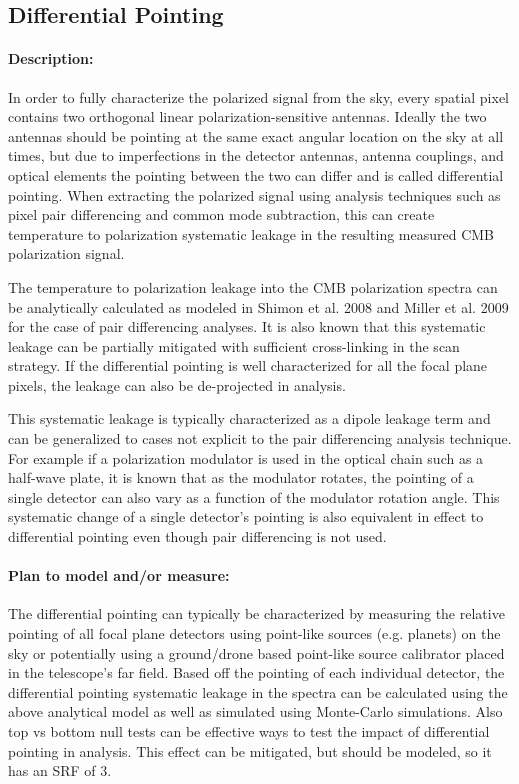 \subsection{Differential Pointing}

\paragraph{Description:}
In order to fully characterize the polarized signal from the sky, every spatial pixel contains two orthogonal linear polarization-sensitive antennas. Ideally the two antennas should be pointing at the same exact angular location on the sky at all times, but due to imperfections in the detector antennas, antenna couplings, and optical elements the pointing between the two can differ and is called differential pointing. When extracting the polarized signal using analysis techniques such as pixel pair differencing and common mode subtraction, this can create temperature to polarization systematic leakage in the resulting measured CMB polarization signal.

The temperature to polarization leakage into the CMB polarization spectra can be analytically calculated as modeled in Shimon et al. 2008 \cite{Shimon_2008} and Miller et al. 2009 \cite{Miller2009Lensing,Miller2009CB} for the case of pair differencing analyses. It is also known that this systematic leakage can be partially mitigated with sufficient cross-linking in the scan strategy. If the differential pointing is well characterized for all the focal plane pixels, the leakage can also be de-projected in analysis. 

This systematic leakage is typically characterized as a dipole leakage term and can be generalized to cases not explicit to the pair differencing analysis technique. For example if a polarization modulator is used in the optical chain such as a half-wave plate, it is known that as the modulator rotates, the pointing of a single detector can also vary as a function of the modulator rotation angle. This systematic change of a single detector's pointing is also equivalent in effect to differential pointing even though pair differencing is not used.

\paragraph{Plan to model and/or measure:}
The differential pointing can typically be characterized by measuring the relative pointing of all focal plane detectors using point-like sources (e.g. planets) on the sky or potentially using a ground/drone based point-like source calibrator placed in the telescope's far field. Based off the pointing of each individual detector, the differential pointing systematic leakage in the spectra can be calculated using the above analytical model as well as simulated using Monte-Carlo simulations. Also top vs bottom null tests can be effective ways to test the impact of differential pointing in analysis. This effect can be mitigated, but should be modeled, so it has an SRF of 3.

